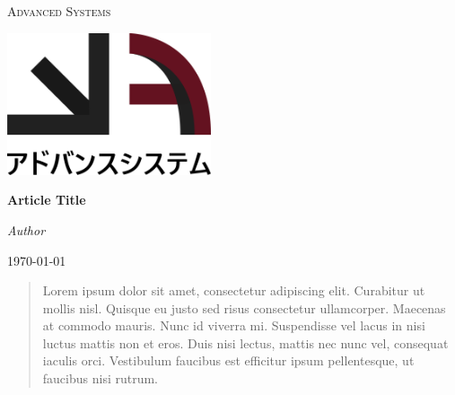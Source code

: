 \documentclass[a4paper]{article}
\begin{document}
\begin{titlepage}
    \centering
    {\scshape\Huge Advanced Systems \par}
    \par\vspace{1cm}
    \includegraphics[width=0.45\textwidth]{advanced-systems-logo.png}\par
    \vspace{3cm}
    {\huge\bfseries Article Title \par}
    \vspace{1cm}
    {\LARGE\itshape Author \par}
    \vspace{1cm}
    {\large\today\par}
    \vfill
    \begin{abstract}
        Lorem ipsum dolor sit amet, consectetur adipiscing elit. Curabitur ut
        mollis nisl. Quisque eu justo sed risus consectetur ullamcorper. Maecenas
        at commodo mauris. Nunc id viverra mi. Suspendisse vel lacus in nisi luctus
        mattis non et eros. Duis nisi lectus, mattis nec nunc vel, consequat iaculis
        orci. Vestibulum faucibus est efficitur ipsum pellentesque, ut faucibus
        nisi rutrum.
    \end{abstract}
\end{titlepage}

\newpage

\printnoidxglossary[type=\acronymtype]

\newpage

\tableofcontents

\newpage





\newpage

\medskip
\printbibliography
\end{document}
